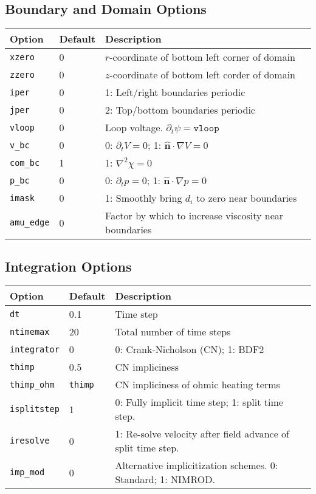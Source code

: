 \documentclass[letterpaper]{book}
\renewcommand{\vec}[1]{\ensuremath{\mathbf{#1}}}
\newcommand{\grad}[1]{\nabla #1}
\newcommand{\uvec}[1]{\ensuremath{\vec{\hat{#1}}}}
\newcommand{\n}{\ensuremath{\uvec{n}}}
\begin{document}
\subsection{Boundary and Domain Options}

\begin{tabular}{lll}
  \textbf{Option} & \textbf{Default} & \textbf{Description}\\
  \hline
  \texttt{xzero}  & 0 & $r$-coordinate of bottom left corner of domain\\
  \texttt{zzero}  & 0 & $z$-coordinate of bottom left corder of domain\\
  \texttt{iper}   & 0 & 1: Left/right boundaries periodic\\
  \texttt{jper}   & 0 & 2: Top/bottom boundaries periodic\\
  \texttt{vloop}  & 0 & Loop voltage.  $\partial_t \psi = \mathtt{vloop}$\\
  \texttt{v\_bc}  & 0 & 0: $\partial_t V = 0$; 1: $\n \cdot \grad{V} = 0$\\
  \texttt{com\_bc}& 1 & 1: $\nabla^2 \chi = 0$\\
  \texttt{p\_bc}  & 0 & 0: $\partial_t p = 0$; 1: $\n \cdot \grad{p} =
    0$\\
  \texttt{imask}  & 0 & 1: Smoothly bring $d_i$ to zero near
    boundaries\\
  \texttt{amu\_edge}&0& \parbox[t]{2.5in}{Factor by which to
    increase viscosity near boundaries}\\
\end{tabular}


\subsection{Integration Options}
\begin{tabular}{llll}
  \textbf{Option}&\textbf{Default}&\textbf{Description}\\
  \hline
  \texttt{dt}         & 0.1 & Time step\\
  \texttt{ntimemax}   & 20  & Total number of time steps\\
  \texttt{integrator} & 0   & 0: Crank-Nicholson (CN); 1: BDF2\\
  \texttt{thimp}      & 0.5 & CN impliciness\\
  \texttt{thimp\_ohm} & \texttt{thimp} & 
                              CN impliciness of ohmic heating terms\\
  \texttt{isplitstep} & 1   & 0: Fully implicit time step; 
                              1: split time step.\\
  \texttt{iresolve}   & 0   & \parbox[t]{3in}{1: Re-solve velocity after 
                              field advance of split time step.}\\
  \texttt{imp\_mod}   & 0   & \parbox[t]{3in}{Alternative implicitization
    schemes. 0: Standard; 1: NIMROD.}
\end{tabular}
\end{document}
